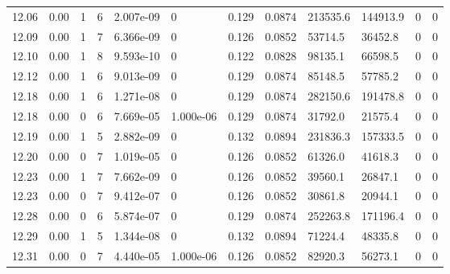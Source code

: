 \documentclass[preview]{standalone}
\begin{document}
{{{{{{{{{{{{{{\begin{tabular}{L{1.2cm}C{1.2cm} C{0.3cm}C{0.5cm} C{1.4cm}C{1.4cm} C{1.4cm}C{1.4cm} C{1.6cm}C{1.6cm} C{1.6cm}C{1.6cm}}
  12.06  &  0.00  & 1     &  6 &  2.007e-09  & 0  &  0.129&   0.0874& 213535.6 & 144913.9   &  0 & 0  \\ 
  12.09  &  0.00  & 1     &  7 &  6.366e-09  & 0  &  0.126&   0.0852& 53714.5 & 36452.8   &  0 & 0  \\ 
  12.10  &  0.00  & 1     &  8 &  9.593e-10  & 0  &  0.122&   0.0828& 98135.1 & 66598.5   &  0 & 0  \\ 
  12.12  &  0.00  & 1     &  6 &  9.013e-09  & 0  &  0.129&   0.0874& 85148.5 & 57785.2   &  0 & 0  \\ 
  12.18  &  0.00  & 1     &  6 &  1.271e-08  & 0  &  0.129&   0.0874& 282150.6 & 191478.8   &  0 & 0  \\ 
  12.18  &  0.00  & 0     &  6 &  7.669e-05  & 1.000e-06  &  0.129&   0.0874& 31792.0 & 21575.4   &  0 & 0  \\ 
  12.19  &  0.00  & 1     &  5 &  2.882e-09  & 0  &  0.132&   0.0894& 231836.3 & 157333.5   &  0 & 0  \\ 
  12.20  &  0.00  & 0     &  7 &  1.019e-05  & 0  &  0.126&   0.0852& 61326.0 & 41618.3   &  0 & 0  \\ 
  12.23  &  0.00  & 1     &  7 &  7.662e-09  & 0  &  0.126&   0.0852& 39560.1 & 26847.1   &  0 & 0  \\ 
  12.23  &  0.00  & 0     &  7 &  9.412e-07  & 0  &  0.126&   0.0852& 30861.8 & 20944.1   &  0 & 0  \\ 
  12.28  &  0.00  & 0     &  6 &  5.874e-07  & 0  &  0.129&   0.0874& 252263.8 & 171196.4   &  0 & 0  \\ 
  12.29  &  0.00  & 1     &  5 &  1.344e-08  & 0  &  0.132&   0.0894& 71224.4 & 48335.8   &  0 & 0  \\ 
  12.31  &  0.00  & 0     &  7 &  4.440e-05  & 1.000e-06  &  0.126&   0.0852& 82920.3 & 56273.1   &  0 & 0  \\ 
\hline 
\end{tabular} 

}}}}}}}}}}}}}}
\end{document}

